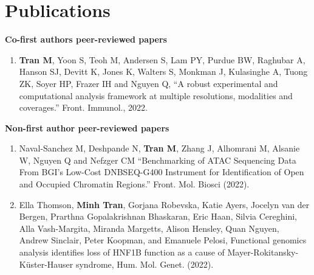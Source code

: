 


\section*{Publications}

\begin{instructional}
    \textbf{Co-first authors peer-reviewed papers}
	
	\begin{enumerate}
    \item \cite{tran2022robust} \textbf{Tran M}, Yoon S, Teoh M, Andersen S, Lam PY, Purdue BW, Raghubar A, Hanson SJ, Devitt K, Jones K, Walters S, Monkman J, Kulasinghe A, Tuong ZK, Soyer HP, Frazer IH and Nguyen Q, ``A robust experimental and computational analysis framework at multiple resolutions, modalities and coverages.'' Front. Immunol., 2022.

    \end{enumerate}
    
    \textbf{Non-first author peer-reviewed papers}
    \begin{enumerate}
        \item \cite{naval2022benchmarking} Naval-Sanchez M, Deshpande N, \textbf{Tran M}, Zhang J, Alhomrani M, Alsanie W, Nguyen Q and Nefzger CM ``Benchmarking of ATAC Sequencing Data From BGI’s Low-Cost DNBSEQ-G400 Instrument for Identification of Open and Occupied Chromatin Regions.'' Front. Mol. Biosci (2022).

        \item Ella Thomson, \textbf{Minh Tran}, Gorjana Robevska, Katie Ayers, Jocelyn van der Bergen, Prarthna Gopalakrishnan Bhaskaran, Eric Haan, Silvia Cereghini, Alla Vash-Margita, Miranda Margetts, Alison Hensley, Quan Nguyen, Andrew Sinclair, Peter Koopman, and Emanuele Pelosi, Functional genomics analysis identifies loss of HNF1B function as a cause of Mayer-Rokitansky-Küster-Hauser syndrome, Hum. Mol. Genet. (2022).


\end{enumerate}
\end{instructional}
